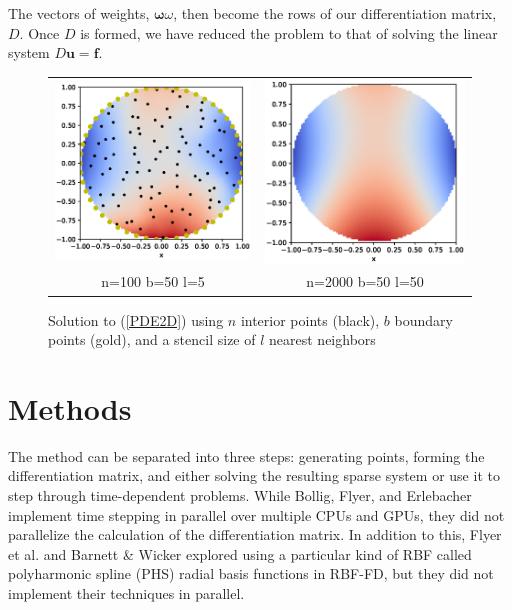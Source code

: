 \documentclass[12pt]{article}
\let\vec\mathbf
\begin{document}
The vectors of weights, $\mathbf{\omega}\omega$, then become the rows of our differentiation matrix, $D$. Once $D$ is formed, we have reduced the problem to that of solving the linear system $D\vec{u} = \vec{f}$. \bigbreak

\begin{figure}[h]
	\begin{tabular}{cc}
		\includegraphics[width=.5\textwidth]{2D_n100_b50} & \includegraphics[width=.5\textwidth]{2D_n2000_b50_l50} \\
		n=100 \phantom{==} b=50 \phantom{==} l=5 & n=2000 \phantom{==} b=50 \phantom{==} l=50 
	\end{tabular}
	\caption{Solution to (\ref{PDE2D}) using $n$ interior points (black), $b$ boundary points (gold), and a stencil size of $l$ nearest neighbors}
	\label{2Dsolutions}
	\centering
\end{figure}

\section{Methods}

	The method can be separated into three steps: generating points, forming the differentiation matrix, and either solving the resulting sparse system or use it to step through time-dependent problems. While Bollig, Flyer, and Erlebacher\cite{Bollig2012} implement time stepping in parallel over multiple CPUs and GPUs, they did not parallelize the calculation of the differentiation matrix. In addition to this, Flyer et al. \cite{Flyer2016-1}\cite{Flyer2017-2} and Barnett \& Wicker \cite{FlyerBarnettWicker2016} explored using a particular kind of RBF called polyharmonic spline (PHS) radial basis functions in RBF-FD, but they did not implement their techniques in parallel.
	
\end{document}
